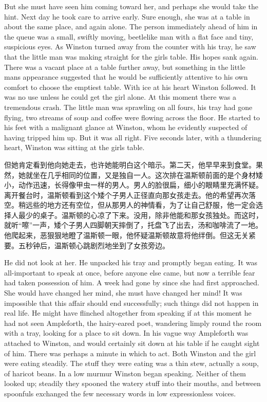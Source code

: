 \begin{paracol}{2}
But she must have seen him coming toward her, and perhaps she would take
the hint. Next day he took care to arrive early. Sure enough, she was at
a table in about the same place, and again alone. The person immediately
ahead of him in the queue was a small, swiftly moving, beetlelike man
with a flat face and tiny, suspicious eyes. As Winston turned away from
the counter with his tray, he saw that the little man was making
straight for the girl\textquotesingle s table. His hopes sank again.
There was a vacant place at a table further away, but something in the
little man\textquotesingle s appearance suggested that he would be
sufficiently attentive to his own comfort to choose the emptiest table.
With ice at his heart Winston followed. It was no use unless he could
get the girl alone. At this moment there was a tremendous crash. The
little man was sprawling on all fours, his tray had gone flying, two
streams of soup and coffee were flowing across the floor. He started to
his feet with a malignant glance at Winston, whom he evidently suspected
of having tripped him up. But it was all right. Five seconds later, with
a thundering heart, Winston was sitting at the girl\textquotesingle s
table.

\switchcolumn

但她肯定看到他向她走去，也许她能明白这个暗示。第二天，他早早来到食堂。果然，她就坐在几乎相同的位置，又是独自一人。这次排在温斯顿前面的是个身材矮小，动作迅速，长得像甲虫一样的男人。男人的脸很扁，细小的眼睛里充满怀疑。离开餐台时，温斯顿看到这个矮个子男人正径直向那女孩走去。他的希望再次落空。稍远些的地方还有空位，但从那男人的神情看，为了让自己舒服，他一定会选择人最少的桌子。温斯顿的心凉了下来。没用，除非他能和那女孩独处。而这时，就听``嚓''一声，矮个子男人四脚朝天摔倒了，托盘飞了出去，汤和咖啡流了一地。他爬起来，恶狠狠地瞪了温斯顿一眼，他怀疑温斯顿故意将他绊倒。但这无关紧要。五秒钟后，温斯顿心跳剧烈地坐到了女孩旁边。

\switchcolumn*

He did not look at her. He unpacked his tray and promptly began eating.
It was all-important to speak at once, before anyone else came, but now
a terrible fear had taken possession of him. A week had gone by since
she had first approached. She would have changed her mind, she must have
changed her mind! It was impossible that this affair should end
successfully; such things did not happen in real life. He might have
flinched altogether from speaking if at this moment he had not seen
Ampleforth, the hairy-eared poet, wandering limply round the room with a
tray, looking for a place to sit down. In his vague way Ampleforth was
attached to Winston, and would certainly sit down at his table if he
caught sight of him. There was perhaps a minute in which to act. Both
Winston and the girl were eating steadily. The stuff they were eating
was a thin stew, actually a soup, of haricot beans. In a low murmur
Winston began speaking. Neither of them looked up; steadily they spooned
the watery stuff into their mouths, and between spoonfuls exchanged the
few necessary words in low expressionless voices.


\end{paracol}
